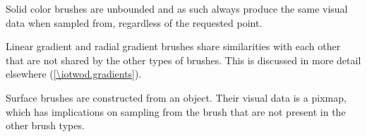 %
%
%
%
%
%
\pnum
Solid color brushes are unbounded and as such always produce the same visual data when sampled from, regardless of the requested point.

\pnum
Linear gradient and radial gradient brushes share similarities with each other that are not shared by the other types of brushes. This is discussed in more detail elsewhere (\ref{\iotwod.gradients}).

\pnum
Surface brushes are constructed from an  object. Their visual data is a pixmap, which has implications on sampling from the brush that are not present in the other brush types.

\addtocounter{SectionDepthBase}{1}





%

\addtocounter{SectionDepthBase}{-1}
